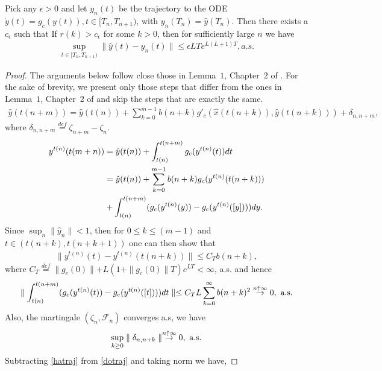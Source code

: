 \begin{lemma}\label{trackyfull}
Pick any $\epsilon >0$ and let $y_n(t)$ be the trajectory to the ODE $\dot{y}(t)=g_c(y(t)), t\in [T_n,T_{n+1})$, with $y_n(T_n)=\hat{y}(T_n)$. Then there exists a $c_\epsilon$ such that If $r(k)>c_\epsilon$ for some $k>0$, then for sufficiently large $n$ we have
\begin{align}
\sup_{t \in [T_n,T_{n+1})} \parallel \hat{y}(t)-y_n(t)\parallel \leq \epsilon LT e^{L(L+1)T}, a.s.
\end{align}
\end{lemma}
\begin{proof}
The arguments below follow close those in Lemma~$1$, Chapter~$2$ of \cite{SA}. For the sake of brevity, we present only those steps that differ from the ones in Lemma~$1$, Chapter~$2$ of \cite{SA} and skip the steps that are exactly the same.
\begin{align}\label{dotraj}
\hat{y}(t(n+m))=\hat{y}(t(n))+\sum_{k=0}^{m-1} b(n+k)g'_c(\hat{x}(t(n+k)),\hat{y}(t(n+k)))+\delta_{n,n+m},
\end{align}
where $\delta_{n,n+m}\stackrel{def}{=}\zeta_{n+m}-\zeta_n$.
\begin{align}\label{hatraj}
y^{t(n)}(t(m+n))&=\hat{y}(t(n))+\int_{t(n)}^{t(n+m)} g_c(y^{t(n)}(t))dt\nonumber\\
&=\hat{y}(t(n))+\sum_{k=0}^{m-1}b(n+k) g_c(y^{t(n)}(t(n+k)))\nonumber\\
&+ \int_{t(n)}^{t(n+m)}(g_c(y^{t(n)}(y) ) -g_c(y^{t(n)}([y]) ) )dy.
\end{align}
Since $\sup_n\parallel \hat{y}_n\parallel <1$, then for $0\leq k \leq (m-1)$ and 
$t\in (t(n+k),t(n+k+1))$ one can then show that 
\begin{align}
\parallel y^{t(n)}(t)-y^{t(n)}(t(n+k))\parallel \leq C_Tb(n+k),
\end{align}
where $C_T\stackrel{def}{=}\parallel g_c(0)\parallel +L (1+\parallel g_c(0)\parallel T)e^{LT}<\infty$, a.s.
and hence
\begin{align}
\parallel \int_{t(n)}^{t(n+m)} (g_c(y^{t(n)}(t))-g_c(y^{t(n)}([t])))dt\parallel \leq 
C_T L\sum_{k=0}^{\infty}b(n+k)^2 \stackrel{n\uparrow \infty}{\rightarrow} 0, \text{ a.s.}
\end{align}
Also, the martingale $(\zeta_n,\mathcal{F}_n)$ converges a.s, we have
\begin{align}
\sup_{k\geq 0}\parallel \delta_{n,n+k}\parallel \stackrel{n\uparrow \infty}{\rightarrow} 0, \text{ a.s.}
\end{align}
Subtracting \eqref{hatraj} from \eqref{dotraj} and taking norm we have,

\end{proof}
